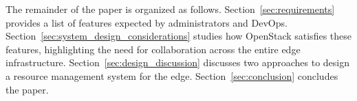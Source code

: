 The remainder of the paper is organized as follows.
Section~\ref{sec:requirements} provides a list of features expected by administrators
and DevOps.
Section~\ref{sec:system_design_considerations} studies how OpenStack satisfies
these features, highlighting the need for collaboration across the
entire edge infrastructure. Section~\ref{sec:design_discussion} discusses two
approaches to design a resource management system for the edge.
Section~\ref{sec:conclusion} concludes the paper.

